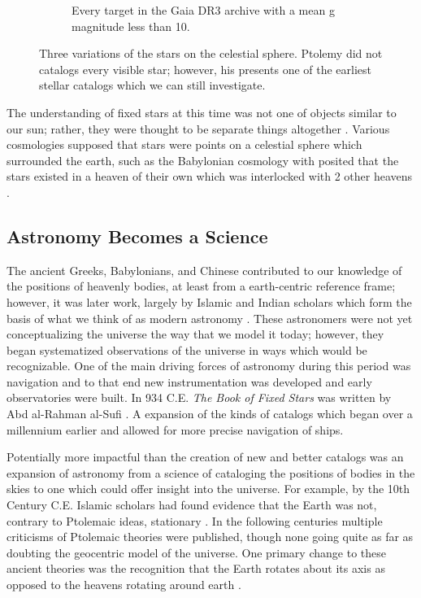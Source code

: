 \begin{figure}[htbp]
\begin{subfigure}[t]{0.3\textwidth}
      \caption{Every target in the Gaia DR3 archive with a mean g magnitude less than 10. }
      \label{fig:starsL10}
  \end{subfigure}
  \caption{Three variations of the stars on the celestial sphere. Ptolemy did
  not catalogs every visible star; however, his presents one of the earliest
  stellar catalogs which we can still investigate.}
  \label{fig:starsInHistory}
\end{figure}

The understanding of fixed stars at this time was not one of objects similar to
our sun; rather, they were thought to be separate things altogether
\citep{Evans1998, Noegel2010, Penprase2017}. Various cosmologies supposed that
stars were points on a celestial sphere which surrounded the earth, such as the
Babylonian cosmology with posited that the stars existed in a heaven of their
own which was interlocked with 2 other heavens \citep{Lambert1987, Steele2016}.

\subsection{Astronomy Becomes a Science}
The ancient Greeks, Babylonians, and Chinese contributed to our knowledge of
the positions of heavenly bodies, at least from a earth-centric reference
frame; however, it was later work, largely by Islamic and Indian scholars which
form the basis of what we think of as modern astronomy \citep{Saliba1982,
Evans1998, Saliba2002, Kapoor2018, Kolachana2019}. These astronomers were not
yet conceptualizing the universe the way that we model it today; however, they
began systematized observations of the universe in ways which would be
recognizable. One of the main driving forces of astronomy during this period
was navigation and to that end new instrumentation was developed and early
observatories were built. In 934 C.E. \textit{The Book of Fixed Stars} was
written by Abd al-Rahman al-Sufi \citep{Hafez2010, Hafez2015}. A expansion of
the kinds of catalogs which began over a millennium earlier and allowed for
more precise navigation of ships. 

Potentially more impactful than the creation of new and better catalogs was an
expansion of astronomy from a science of cataloging the positions of bodies in
the skies to one which could offer insight into the universe. For example, by
the 10th Century C.E. Islamic scholars had found evidence that the Earth was
not, contrary to Ptolemaic ideas, stationary \citep{Baga2020}. In
the following centuries multiple criticisms of Ptolemaic theories were
published, though none going quite as far as doubting the geocentric model of
the universe. One primary change to these ancient theories was the recognition
that the Earth rotates about its axis as opposed to the heavens rotating around
earth \citep{Bendaoud2023}. 

